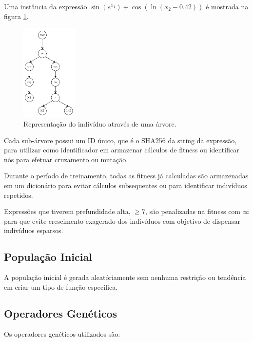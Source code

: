 Uma instância da expressão $\sin(e^{x_1}) + \cos(\ln(x_2 - 0.42))$ é mostrada na figura \ref{fig:indtree}. 

\begin{figure}
  \centering
  \includegraphics[width=0.25\textwidth]{pdf/expre.pdf}
  \caption{Representação do indivíduo através de uma árvore.}
  \label{fig:indtree}
\end{figure}

Cada sub-árvore possui um ID único, que é o SHA256 da string da expressão, para utilizar como identificador em armazenar cálculos de fitness ou identificar nós para efetuar cruzamento ou mutação.

Durante o período de treinamento, todas as fitness já calculadas são armazenadas em um dicionário para evitar cálculos subsequentes ou para identificar indivíduos repetidos.

Expressões que tiverem prefundidade alta, $\ge 7$, são penalizadas na fitness com $\infty$ para que evite crescimento exagerado dos indivíduos com objetivo de dispensar indivíduos esparsos.

\subsection{População Inicial}

A população inicial é gerada aleatóriamente sem nenhuma restrição ou tendência em criar um tipo de função especifica.

\subsection{Operadores Genéticos}

Os operadores genéticos utilizados são:

